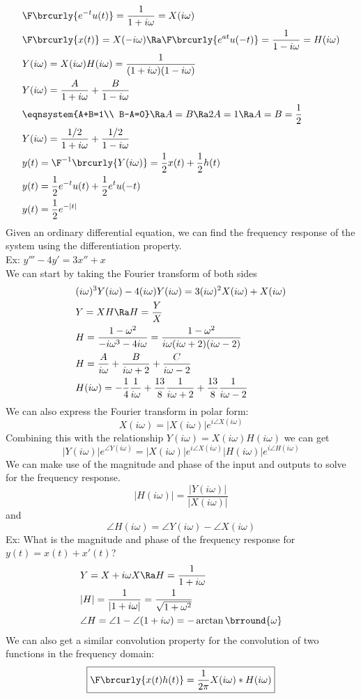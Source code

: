 \begin{align*}
    &\F\brcurly{e^{-t}u(t)}=\frac{1}{1+i\omega}=X(i\omega)\\
    &\F\brcurly{x(t)}=X(-i\omega)\Ra \F\brcurly{e^{at}u(-t)}=\frac{1}{1-i\omega}=H(i\omega)\\
    &Y(i\omega)=X(i\omega)H(i\omega)=\frac{1}{(1+i\omega)(1-i\omega)}\\
    &Y(i\omega)=\frac{A}{1+i\omega}+\frac{B}{1-i\omega}\\
    &\eqnsystem{A+B=1\\ B-A=0}\Ra A=B\Ra 2A=1\Ra A=B=\frac{1}{2}\\
    &Y(i\omega)=\frac{1/2}{1+i\omega}+\frac{1/2}{1-i\omega}\\
    &y(t)=\F^{-1}\brcurly{Y(i\omega)}=\frac{1}{2}x(t)+\frac{1}{2}h(t)\\
    &y(t)=\frac{1}{2}e^{-t}u(t)+\frac{1}{2}e^tu(-t)\\
    &y(t)=\frac{1}{2}e^{-|t|}
\end{align*}
Given an ordinary differential equation, we can find the frequency response of the system using the differentiation property.\\
Ex: $y'''-4y'=3x''+x$\\
We can start by taking the Fourier transform of both sides
\begin{align*}
    &(i\omega)^3Y(i\omega)-4(i\omega)Y(i\omega)=3(i\omega)^2X(i\omega)+X(i\omega)\\
    &Y=XH\Ra H=\frac{Y}{X}\\
    &H=\frac{1-\omega^2}{-i\omega^3-4i\omega}=\frac{1-\omega^2}{i\omega(i\omega+2)(i\omega-2)}\\
    &H=\frac{A}{i\omega}+\frac{B}{i\omega+2}+\frac{C}{i\omega-2}\\
    &H(i\omega)=-\frac{1}{4}\frac{1}{i\omega}+\frac{13}{8}\frac{1}{i\omega+2}+\frac{13}{8}\frac{1}{i\omega-2}
\end{align*}
We can also express the Fourier transform in polar form:
$$X(i\omega)=|X(i\omega)|e^{i\angle X(i\omega)}$$
Combining this with the relationship $Y(i\omega)=X(i\omega)H(i\omega)$ we can get
\[ |Y(i\omega)|e^{\angle Y(i\omega)}=|X(i\omega)|e^{i\angle X(i\omega)}|H(i\omega)|e^{i\angle H(i\omega)} \]
We can make use of the magnitude and phase of the input and outputs to solve for the frequency response.
$$|H(i\omega)|=\frac{|Y(i\omega)|}{|X(i\omega)|}$$
and
$$\angle H(i\omega)=\angle Y(i\omega)-\angle X(i\omega)$$
Ex: What is the magnitude and phase of the frequency response for $y(t)=x(t)+x'(t)$?
\begin{align*}
    &Y=X+i\omega X\Ra H=\frac{1}{1+i\omega}\\
    &|H|=\frac{1}{|1+i\omega|}=\frac{1}{\sqrt{1+\omega^2}}\\
    &\angle H=\angle 1-\angle(1+i\omega)=-\arctan\brround{\omega}
\end{align*}
We can also get a similar convolution property for the convolution of two functions in the frequency domain:
$$\boxed{\F\brcurly{x(t)h(t)}=\frac{1}{2\pi}X(i\omega)*H(i\omega)}$$

